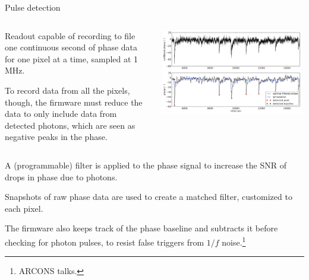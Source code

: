 \documentclass[ignorenonframetext,12pt]{beamer}
\begin{document}
\begin{frame}{Pulse detection}
				\begin{columns}
				\begin{column}{0.49\textwidth}
								\scriptsize{Readout capable of recording to file one continuous
								second of phase data for one pixel at a time, \alert{sampled at
								1\,MHz}. 

								To record data from all the pixels, though, the firmware must
								reduce the data to only include data from detected photons,
								which are seen as negative peaks in the phase.}
				\end{column}
				\begin{column}{0.49\textwidth}
				\centering
								\includegraphics[width=0.98\textwidth]{pulsos_de_fase}
				\end{column}
				\end{columns}
				\scriptsize{A (programmable) filter is applied to the phase signal to increase the
				SNR of drops in phase due to photons.  
				
				{\color{blue}Snapshots	of raw phase data are used to create a
				\alert{matched filter},	customized to each pixel.}

				The {\color{blue}firmware} also keeps track of the phase baseline and subtracts it
				before checking for photon pulses, to resist false triggers from $1/f$
				noise.\footnote{ARCONS talks.}}
\end{frame}
%
%
%
\end{document}
